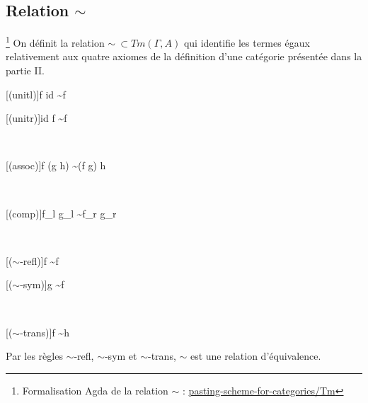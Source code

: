 \documentclass[conference]{IEEEtran}
\begin{document}
	\subsection{Relation $\sim$}
	\footnote{Formalisation Agda de la relation $\sim$ : \href{https://github.com/ehouget/L3-ENS-Internship/tree/main/pasting-scheme-for-categories/Tm}{pasting-scheme-for-categories/Tm}}
	On définit la relation $\sim\ \subset Tm(\Gamma, A)$ qui identifie les termes égaux relativement aux quatre axiomes de la définition d'une catégorie présentée dans la partie II. 
	\begin{center}
		\begin{prooftree}
			{f \cdot id \sim f}
		\end{prooftree}
		\hspace{10pt}
		\begin{prooftree}
			{id \cdot f \sim f}
		\end{prooftree} \\
		\vspace{20pt}
		\begin{prooftree}
			{f \cdot (g \cdot h) \sim (f \cdot g) \cdot h}
		\end{prooftree} \\
		\vspace{20pt}
		\begin{prooftree}
			\hypo[]{f_l \sim f_r}
			\hypo[]{g_l \sim g_r}
			[(comp)]{f_l \cdot g_l \sim f_r \cdot g_r}
		\end{prooftree} \\
		\vspace{20pt}
		\begin{prooftree}
			[($\sim$-refl)]{f \sim f}
		\end{prooftree}
		\hspace{20pt}
		\begin{prooftree}
			\hypo[]{f \sim g}
			[($\sim$-sym)]{g \sim f}
		\end{prooftree} \\
		\vspace{18pt}
		\begin{prooftree}
			\hypo[]{f \sim g}
			\hypo[]{g \sim h}
			[($\sim$-trans)]{f \sim h}
		\end{prooftree}
		\vspace{10pt}
	\end{center}
	
	Par les règles $\sim$-refl, $\sim$-sym et $\sim$-trans, $\sim$ est une relation d'équivalence.
	
\end{document}
